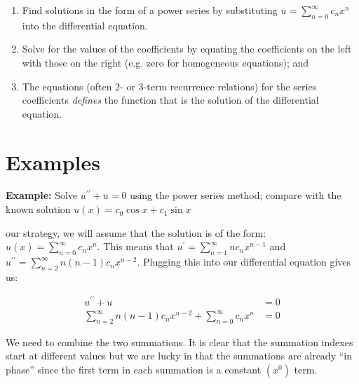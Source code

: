 \begin{enumerate}
\item Find solutions in the form of a power series by substituting $u = \sum\limits_{n=0}^{\infty} c_n x^n$ into the differential equation.
\item Solve for the values of the coefficients by equating the coefficients on the left with those on the right (e.g. zero for homogeneous equations); and
\item The equations (often 2- or 3-term recurrence relations) for the series coefficients \emph{defines} the function that is the solution of the differential equation.
\end{enumerate}

\section{Examples}

\noindent\textbf{Example:} Solve $u^{\prime \prime}+u = 0$ using the power series method; compare with the known solution $u(x)=c_0\cos{x}+c_1\sin{x}$

 our strategy, we will assume that the solution is of the form: $u(x)=\sum_{n=0}^{\infty} c_n x^n$.  This means that $u^{\prime} = \sum_{n=1}^{\infty} n c_n x^{n-1}$ and $u^{\prime \prime} = \sum_{n=2}^{\infty} n(n-1)c_nx^{n-2}$.  Plugging this into our differential equation gives us:

\begin{align*}
u^{\prime \prime} + u &= 0 \\
\sum\limits_{n=2}^{\infty} n(n-1)c_nx^{n-2} + \sum\limits_{n=0}^{\infty} c_n x^n &= 0
\end{align*}

\noindent We need to combine the two summations.  It is clear that the summation indexes start at different values but we are lucky in that the summations are already ``in phase'' since the first term in each summation is a constant $(x^0)$ term.

